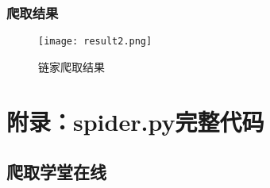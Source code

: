\documentclass[lang=cn,11pt,a4paper]{elegantpaper}
\begin{document}
\clearpage

\subsubsection{爬取结果}

\begin{figure}[!htb]
    \centering
    \texttt{[image: result2.png]}
    \caption{链家爬取结果}
    \label{fig:enter-label}
\end{figure}

\section{附录：spider.py完整代码}

\subsection{爬取学堂在线}
\end{document}
